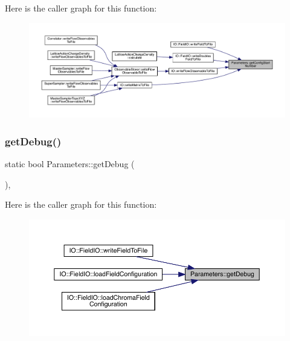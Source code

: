 Here is the caller graph for this function\+:\nopagebreak
\begin{figure}[H]
\begin{center}
\leavevmode
\includegraphics[width=350pt]{class_parameters_a58f15668b37e705d34d6588e287e4bc0_icgraph}
\end{center}
\end{figure}
\mbox{\label{class_parameters_a265e274127b6d845e43c66d94463f051}} 
\subsubsection{\texorpdfstring{getDebug()}{getDebug()}}
{\footnotesize\ttfamily static bool Parameters\+::get\+Debug (\begin{DoxyParamCaption}{ }\end{DoxyParamCaption})\hspace{0.3cm}{\ttfamily [inline]}, {\ttfamily [static]}}

Here is the caller graph for this function\+:\nopagebreak
\begin{figure}[H]
\begin{center}
\leavevmode
\includegraphics[width=350pt]{class_parameters_a265e274127b6d845e43c66d94463f051_icgraph}
\end{center}
\end{figure}
\mbox{\label{class_parameters_a9fa8d9376dcba8e98b3fff764e1059d7}} 
